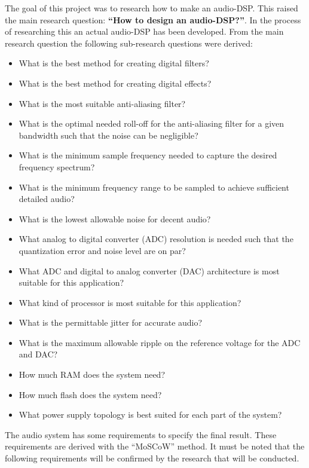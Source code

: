 The goal of this project was to research how to make an audio-DSP. This raised the main research question: \textbf{“How to design an audio-DSP?”}. In the process of researching this an actual audio-DSP has been developed. From the main research question the following sub-research questions were derived:
\begin{itemize} %
	\setlength\itemsep{-0.3em} %
	\item What is the best method for creating digital filters?
	\item What is the best method for creating digital effects?
	\item What is the most suitable anti-aliasing filter?
	\item What is the optimal needed roll-off for the anti-aliasing filter for a given bandwidth such that the noise can be negligible?
	\item What is the minimum sample frequency needed to capture the desired frequency spectrum?
	\item What is the minimum frequency range to be sampled to achieve sufficient detailed audio?
	\item What is the lowest allowable noise for decent audio?
	\item What analog to digital converter (ADC) resolution is needed such that the quantization error and noise level are on par?
	\item What ADC and digital to analog converter (DAC) architecture is most suitable for this application?
	\item What kind of processor is most suitable for this application?
	\item What is the permittable jitter for accurate audio?
	\item What is the maximum allowable ripple on the reference voltage for the ADC and DAC?
	\item How much RAM does the system need?
	\item How much flash does the system need?
	\item What power supply topology is best suited for each part of the system?
\end{itemize}



\par
\noindent
The audio system has some requirements to specify the final result. These requirements are derived with the “MoSCoW” method. It must be noted that the following requirements will be confirmed by the research that will be conducted.

